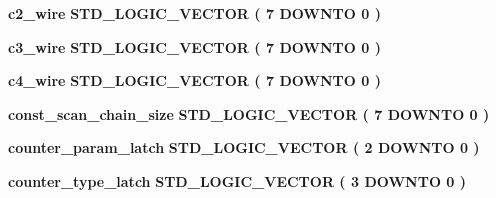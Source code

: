 \begin{DoxyCompactItemize}
{\bf c2\+\_\+wire} {\bfseries \textcolor{comment}{S\+T\+D\+\_\+\+L\+O\+G\+I\+C\+\_\+\+V\+E\+C\+T\+OR}\textcolor{vhdlchar}{ }\textcolor{vhdlchar}{(}\textcolor{vhdlchar}{ }\textcolor{vhdlchar}{ } \textcolor{vhdldigit}{7} \textcolor{vhdlchar}{ }\textcolor{keywordflow}{D\+O\+W\+N\+TO}\textcolor{vhdlchar}{ }\textcolor{vhdlchar}{ } \textcolor{vhdldigit}{0} \textcolor{vhdlchar}{ }\textcolor{vhdlchar}{)}\textcolor{vhdlchar}{ }} 
\item 
{\bf c3\+\_\+wire} {\bfseries \textcolor{comment}{S\+T\+D\+\_\+\+L\+O\+G\+I\+C\+\_\+\+V\+E\+C\+T\+OR}\textcolor{vhdlchar}{ }\textcolor{vhdlchar}{(}\textcolor{vhdlchar}{ }\textcolor{vhdlchar}{ } \textcolor{vhdldigit}{7} \textcolor{vhdlchar}{ }\textcolor{keywordflow}{D\+O\+W\+N\+TO}\textcolor{vhdlchar}{ }\textcolor{vhdlchar}{ } \textcolor{vhdldigit}{0} \textcolor{vhdlchar}{ }\textcolor{vhdlchar}{)}\textcolor{vhdlchar}{ }} 
\item 
{\bf c4\+\_\+wire} {\bfseries \textcolor{comment}{S\+T\+D\+\_\+\+L\+O\+G\+I\+C\+\_\+\+V\+E\+C\+T\+OR}\textcolor{vhdlchar}{ }\textcolor{vhdlchar}{(}\textcolor{vhdlchar}{ }\textcolor{vhdlchar}{ } \textcolor{vhdldigit}{7} \textcolor{vhdlchar}{ }\textcolor{keywordflow}{D\+O\+W\+N\+TO}\textcolor{vhdlchar}{ }\textcolor{vhdlchar}{ } \textcolor{vhdldigit}{0} \textcolor{vhdlchar}{ }\textcolor{vhdlchar}{)}\textcolor{vhdlchar}{ }} 
\item 
{\bf const\+\_\+scan\+\_\+chain\+\_\+size} {\bfseries \textcolor{comment}{S\+T\+D\+\_\+\+L\+O\+G\+I\+C\+\_\+\+V\+E\+C\+T\+OR}\textcolor{vhdlchar}{ }\textcolor{vhdlchar}{(}\textcolor{vhdlchar}{ }\textcolor{vhdlchar}{ } \textcolor{vhdldigit}{7} \textcolor{vhdlchar}{ }\textcolor{keywordflow}{D\+O\+W\+N\+TO}\textcolor{vhdlchar}{ }\textcolor{vhdlchar}{ } \textcolor{vhdldigit}{0} \textcolor{vhdlchar}{ }\textcolor{vhdlchar}{)}\textcolor{vhdlchar}{ }} 
\item 
{\bf counter\+\_\+param\+\_\+latch} {\bfseries \textcolor{comment}{S\+T\+D\+\_\+\+L\+O\+G\+I\+C\+\_\+\+V\+E\+C\+T\+OR}\textcolor{vhdlchar}{ }\textcolor{vhdlchar}{(}\textcolor{vhdlchar}{ }\textcolor{vhdlchar}{ } \textcolor{vhdldigit}{2} \textcolor{vhdlchar}{ }\textcolor{keywordflow}{D\+O\+W\+N\+TO}\textcolor{vhdlchar}{ }\textcolor{vhdlchar}{ } \textcolor{vhdldigit}{0} \textcolor{vhdlchar}{ }\textcolor{vhdlchar}{)}\textcolor{vhdlchar}{ }} 
\item 
{\bf counter\+\_\+type\+\_\+latch} {\bfseries \textcolor{comment}{S\+T\+D\+\_\+\+L\+O\+G\+I\+C\+\_\+\+V\+E\+C\+T\+OR}\textcolor{vhdlchar}{ }\textcolor{vhdlchar}{(}\textcolor{vhdlchar}{ }\textcolor{vhdlchar}{ } \textcolor{vhdldigit}{3} \textcolor{vhdlchar}{ }\textcolor{keywordflow}{D\+O\+W\+N\+TO}\textcolor{vhdlchar}{ }\textcolor{vhdlchar}{ } \textcolor{vhdldigit}{0} \textcolor{vhdlchar}{ }\textcolor{vhdlchar}{)}\textcolor{vhdlchar}{ }} 

\end{DoxyCompactItemize}
